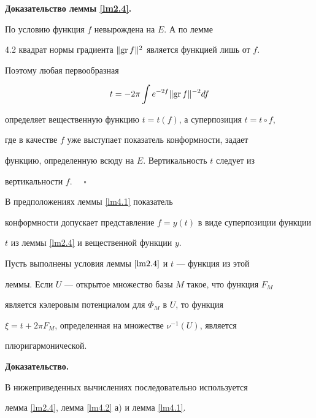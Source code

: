 {\bf Доказательство леммы \ref{lm2.4}.}


По условию функция $f$ невырождена на $E$. А по лемме


4.2 квадрат нормы градиента $\|{\operatorname{gr} f}\|^2$ является функцией лишь от $f$.


Поэтому любая первообразная


$$


t=-2\pi \int e^{-2f}\Norma{\GR f}^{-2}df


$$


определяет вещественную функцию $t=t(f)$, а суперпозиция $t=t\circ f$,


где в качестве $f$ уже выступает показатель конформности, задает


функцию, определенную всюду на $E$. Вертикальность $t$ следует из


вертикальности $f$. $\quad\square$





\begin{cors}\label{co4.3}


В предположениях леммы \ref{lm4.1} показатель


конформности допускает представление $f=y(t)$ в виде суперпозиции функции


$t$ из леммы \ref{lm2.4} и вещественной функции $y$.


\end{cors}





\begin{lems}\label{lm4.4}


Пусть выполнены условия леммы $\ref{lm2.4}$ и $t$ --- функция из этой


леммы. Если $U$ --- открытое множество базы $M$ такое, что функция $F_M$


является кэлеровым потенциалом для $\Phi_M$ в $U$, то функция


$\xi=t+2\pi F_M$, определенная на множестве $\nu^{-1}(U)$, является


плюригармонической.


\end{lems}





{\bf Доказательство.}


В нижеприведенных вычислениях последовательно используется


лемма \ref{lm2.4}, лемма \ref{lm4.2} а) и лемма \ref{lm4.1}.



